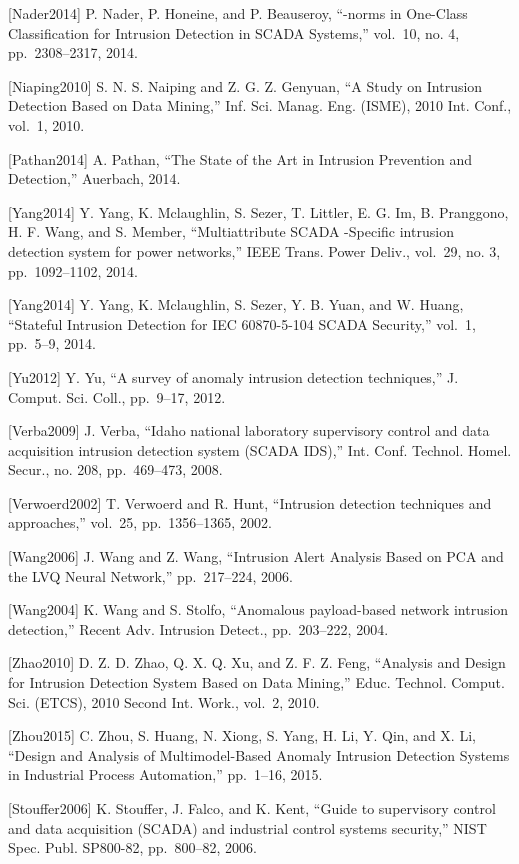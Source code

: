 \documentclass[12pt,]{article}
\begin{document}
{[}Nader2014{]} P. Nader, P. Honeine, and P. Beauseroy, ``-norms in
One-Class Classification for Intrusion Detection in SCADA Systems,''
vol.~10, no. 4, pp.~2308--2317, 2014.

{[}Niaping2010{]} S. N. S. Naiping and Z. G. Z. Genyuan, ``A Study on
Intrusion Detection Based on Data Mining,'' Inf. Sci. Manag. Eng.
(ISME), 2010 Int. Conf., vol.~1, 2010.

{[}Pathan2014{]} A. Pathan, ``The State of the Art in Intrusion
Prevention and Detection,'' Auerbach, 2014.

{[}Yang2014{]} Y. Yang, K. Mclaughlin, S. Sezer, T. Littler, E. G. Im,
B. Pranggono, H. F. Wang, and S. Member, ``Multiattribute SCADA
-Specific intrusion detection system for power networks,'' IEEE Trans.
Power Deliv., vol.~29, no. 3, pp.~1092--1102, 2014.

{[}Yang2014{]} Y. Yang, K. Mclaughlin, S. Sezer, Y. B. Yuan, and W.
Huang, ``Stateful Intrusion Detection for IEC 60870-5-104 SCADA
Security,'' vol.~1, pp.~5--9, 2014.

{[}Yu2012{]} Y. Yu, ``A survey of anomaly intrusion detection
techniques,'' J. Comput. Sci. Coll., pp.~9--17, 2012.

{[}Verba2009{]} J. Verba, ``Idaho national laboratory supervisory
control and data acquisition intrusion detection system (SCADA IDS),''
Int. Conf. Technol. Homel. Secur., no. 208, pp.~469--473, 2008.

{[}Verwoerd2002{]} T. Verwoerd and R. Hunt, ``Intrusion detection
techniques and approaches,'' vol.~25, pp.~1356--1365, 2002.

{[}Wang2006{]} J. Wang and Z. Wang, ``Intrusion Alert Analysis Based on
PCA and the LVQ Neural Network,'' pp.~217--224, 2006.

{[}Wang2004{]} K. Wang and S. Stolfo, ``Anomalous payload-based network
intrusion detection,'' Recent Adv. Intrusion Detect., pp.~203--222,
2004.

{[}Zhao2010{]} D. Z. D. Zhao, Q. X. Q. Xu, and Z. F. Z. Feng, ``Analysis
and Design for Intrusion Detection System Based on Data Mining,'' Educ.
Technol. Comput. Sci. (ETCS), 2010 Second Int. Work., vol.~2, 2010.

{[}Zhou2015{]} C. Zhou, S. Huang, N. Xiong, S. Yang, H. Li, Y. Qin, and
X. Li, ``Design and Analysis of Multimodel-Based Anomaly Intrusion
Detection Systems in Industrial Process Automation,'' pp.~1--16, 2015.

{[}Stouffer2006{]} K. Stouffer, J. Falco, and K. Kent, ``Guide to
supervisory control and data acquisition (SCADA) and industrial control
systems security,'' NIST Spec. Publ. SP800-82, pp.~800--82, 2006.
\end{document}
